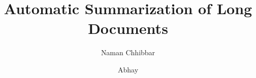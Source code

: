 \documentclass{beamer}
\title{Automatic Summarization of Long Documents}
\author[Naman Chhibbar \\ Abhay]{
  Naman Chhibbar \and
  Abhay
}
\institute{Indian Institute of Technology Hyderabad}
\begin{document}
  \begin{frame}
    \titlepage
  \end{frame}

  
\end{document}
